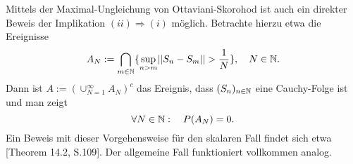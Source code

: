 \begin{remark}
    Mittels der Maximal-Ungleichung von Ottaviani-Skorohod ist auch ein direkter Beweis der Implikation $(ii) \Rightarrow (i)$ möglich. Betrachte hierzu etwa die Ereignisse 
    $$
        A_N := \bigcap_{m \in \mathbb{N}}\{\sup_{n > m} \lvert\lvert S_n - S_m \rvert\rvert > \frac{1}{N}\}, \quad N \in \mathbb{N}.                                                                                                                        
    $$
    Dann ist $A := (\cup_{N=1}^{\infty} A_N)^c$ das Ereignis, dass $(S_n)_{n \in \mathbb{N}}$ eine Cauchy-Folge ist und man zeigt 
    $$
        \forall N \in \mathbb{N}: \quad P(A_N) = 0. 
    $$
    Ein Beweis mit dieser Vorgehensweise für den skalaren Fall findet sich etwa \cite{bauer}[Theorem 14.2, S.109]. Der allgemeine Fall funktioniert vollkommen analog. \qexampled
\end{remark}



